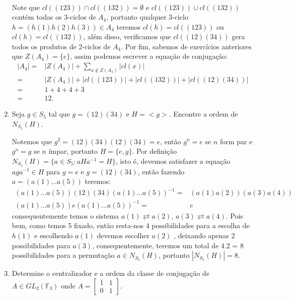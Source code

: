 \documentclass{article}
\begin{document}
\begin{enumerate}
\begin{enumerate}
$$\begin{aligned}
			\end{aligned}
			$$
			\end{enumerate}
			Note que $cl((123)) \cap cl((132)) = \emptyset$ e $cl((123)) \cup cl((132))$ contém todas os 3-ciclos de $A_{4}$, portanto qualquer 3-ciclo $h = (h(1)h(2)h(3)) \in A_{4}$ teremos $cl(h)= cl((123))$ ou $cl(h)= cl((132))$, além disso, verificamos que $cl((12)(34))$ gera todos os produtos de 2-ciclos de $A_{4}$. Por fim, sabemos de exercícios anteriores que $Z(A_{4}) = \{e\}$, assim podemos escrever a equação de conjugação:
			$$
			\begin{aligned}
			|A_{4}| = & |Z(A_{4})| + \sum_{x \notin Z(A_{4})} |cl(x)|
			\\
			=& |Z(A_{4})| + |cl((123))| + |cl((132))| + |cl((12)(34))|
			\\
			=& 1 + 4 + 4 +3
			\\
			=& 12.    
			\end{aligned}
			$$
		\item Seja $g \in S_{5}$ tal que $g=(12)(34)$ e $H=<g>$. Encontre a ordem de $N_{S_{5}}(H)$.
		
		Notemos que $g^{2} = (12)(34)(12)(34) = e$, então $g^{n} = e$ se $n$ form par e $g^{n} = g$ se $n$ ímpar, portanto $H = \{e, g\}$. Por definição $ N_{S_{5}}(H)= \{a \in S_{5}: aHa^{-1} = H\}$, isto é, devemos satisfazer a equação $aga^{-1} \in H$ para $g=e$ e $g = (12)(34)$, então fazendo $a = (a(1) \dots a(5))$ teremos:
		$$
		\begin{aligned}
		(a(1) \dots a(5))(12)(34)(a(1) \dots a(5))^{-1} = & (a(1)a(2))(a(3)a(4)) 
		\\
		(a(1) \dots a(5))e(a(1) \dots a(5))^{-1} = & e
		\end{aligned}
		$$
		consequentemente temos o sistema $a(1) \rightleftarrows a(2)$, $a(3) \rightleftarrows a(4)$. Pois bem, como temos 5 fixado, então resta-nos 4 possibilidades para a escolha de $h(1)$ e escolhendo $a(1)$ devemos escolher $a(2)$ , deixando apenas 2 possibilidades para $a(3)$, consequentemente, teremos um total de 4.2 = 8 possibilidades para a permutação $a \in N_{S_{5}}(H)$, portanto $|N_{S_{5}}(H)| = 8$.
		
		\item Determine o centralizador e a ordem da classe de conjugação de $A \in GL_{2}(\mathbb{F}_{3})$ onde 
		$
		A = 
		\left[
		\begin{array}{cc}
		1 & 1 \\
		0 & 1
		\end{array}
		\right].
		$
		

\end{enumerate}
\end{document}
